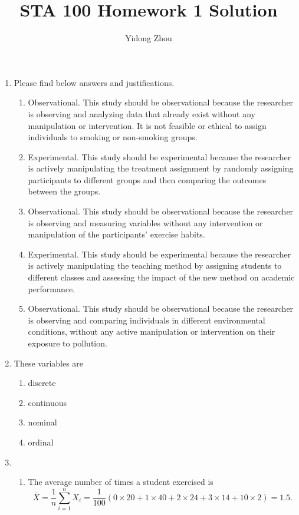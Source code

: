 \documentclass{article}
\title{STA 100 Homework 1 Solution}
\author{Yidong Zhou}
\date{}
\begin{document}
\maketitle
\begin{enumerate}
    \item Please find below answers and justifications.
    \begin{enumerate}
        \item Observational. This study should be observational because the researcher is observing and analyzing data that already exist without any manipulation or intervention. It is not feasible or ethical to assign individuals to smoking or non-smoking groups.
        \item Experimental. This study should be experimental because the researcher is actively manipulating the treatment assignment by randomly assigning participants to different groups and then comparing the outcomes between the groups.
        \item Observational. This study should be observational because the researcher is observing and measuring variables without any intervention or manipulation of the participants' exercise habits.
		\item Experimental. This study should be experimental because the researcher is actively manipulating the teaching method by assigning students to different classes and assessing the impact of the new method on academic performance.
		\item Observational. This study should be observational because the researcher is observing and comparing individuals in different environmental conditions, without any active manipulation or intervention on their exposure to pollution.
    \end{enumerate}
    \item These variables are
    \begin{enumerate}
        \item discrete
        \item continuous
        \item nominal
        \item ordinal
    \end{enumerate}
    \item 
    \begin{enumerate}
        \item The average number of times a student exercised is
    $$\bar{X}=\frac{1}{n}\sum_{i=1}^nX_i=\frac{1}{100}(0\times20+1\times40+2\times24+3\times14+10\times2)=1.5.$$

\end{enumerate}
\end{enumerate}
\end{document}
